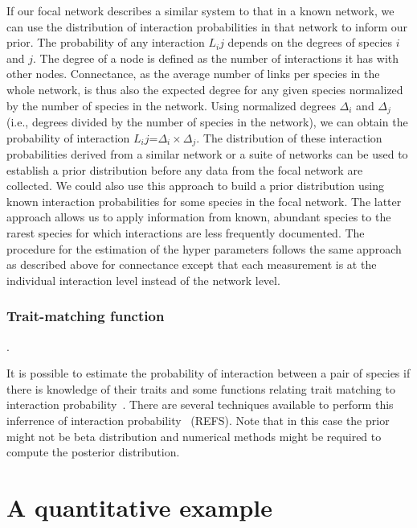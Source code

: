 \documentclass[12pt]{article}
\begin{document}
         
          If our focal network describes a similar system to that in a known network, we can use the distribution of interaction probabilities in that network to inform our prior. The probability of any interaction $L_ij$ depends on the degrees of species $i$ and $j$. The degree of a node is defined as the number of interactions it has with other nodes. Connectance, as the average number of links per species in the whole network, is thus also the expected degree for any given species normalized by the number of species in the network. Using normalized degrees $\Delta_i$ and $\Delta_j$ (i.e., degrees divided by the number of species in the network), we can obtain the probability of interaction $L_ij$=$\Delta_i\times\Delta_j$. The distribution of these interaction probabilities derived from a similar network or a suite of networks can be used to establish a prior distribution before any data from the focal network are collected. We could also use this approach to build a prior distribution using known interaction probabilities for some species in the focal network. The latter approach allows us to apply information from known, abundant species to the rarest species for which interactions are less frequently documented. The procedure for the estimation of the hyper parameters follows the same approach as described above for connectance except that each measurement is at the individual interaction level instead of the network level.


      \subsubsection*{Trait-matching function}. 

          It is possible to estimate the probability of interaction between a pair of species if there is knowledge of their traits and some functions relating trait matching to interaction probability~\citep{Morales-Castilla2015}. There are several techniques available to perform this inferrence of interaction probability~\citep{} (REFS). Note that in this case the prior might not be beta distribution and numerical methods might be required to compute the posterior distribution.  


\section*{A quantitative example}
\end{document}
